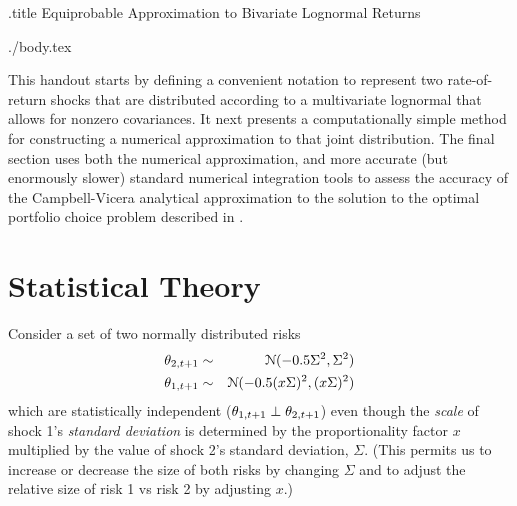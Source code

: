 \documentclass{handout}
\begin{document}
\handoutHeader

\begin{verbatimwrite}{\jobname.title}
Equiprobable Approximation to Bivariate Lognormal Returns
\end{verbatimwrite}

\handoutNameMake


\begin{verbatimwrite}{./body.tex}
  \newcommand{\sigAll}{\Sigma} %
  
\newcommand{\scale}{x}

This handout starts by defining a convenient notation to represent two rate-of-return shocks
that are distributed according to a multivariate lognormal that allows
for nonzero covariances.  It next presents a computationally
simple method for constructing a numerical approximation to that joint distribution.  The final
section uses both the numerical approximation, and more accurate (but enormously slower) standard numerical integration tools to assess the accuracy of the Campbell-Vicera analytical approximation to the solution to the optimal portfolio choice problem
described in .  

\section{Statistical Theory}

Consider a set of two normally distributed risks
\begin{equation*}\begin{gathered}\begin{aligned}
   \ShkMeanOneLog_{2,t+1} & \sim & \mathcal{N}(-0.5 \sigAll^{2},\sigAll^{2})
\\ \ShkMeanOneLog_{1,t+1} & \sim & \mathcal{N}(-0.5 (\scale \sigAll)^{2},(\scale \sigAll)^{2})
\end{aligned}\end{gathered}\end{equation*}
which are statistically independent ($\theta_{1,t+1} \perp \theta_{2,t+1}$) even though the {\it scale} of shock 1's
{\it standard deviation} is determined by the proportionality factor
$\scale$ multiplied by the value of shock 2's standard deviation,
$\sigAll$.  (This permits us to increase or decrease the size of both risks
by changing $\sigAll$ and to adjust the relative size of risk 1 vs risk 2 by adjusting $\scale$.)


\end{verbatimwrite}
\end{document}
